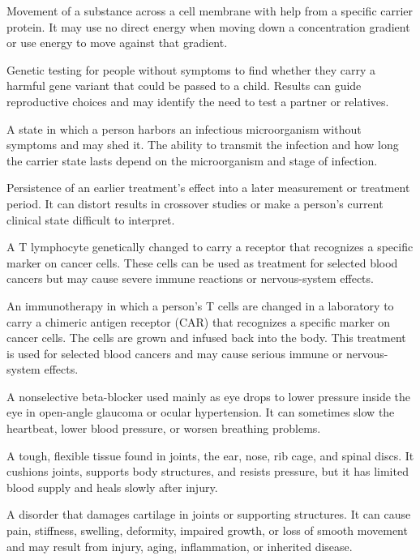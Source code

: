  Movement of a substance across a cell membrane with help from a specific carrier protein. It may use no direct energy when moving down a concentration gradient or use energy to move against that gradient.

 Genetic testing for people without symptoms to find whether they carry a harmful gene variant that could be passed to a child. Results can guide reproductive choices and may identify the need to test a partner or relatives.

 A state in which a person harbors an infectious microorganism without symptoms and may shed it. The ability to transmit the infection and how long the carrier state lasts depend on the microorganism and stage of infection.

 Persistence of an earlier treatment's effect into a later measurement or treatment period. It can distort results in crossover studies or make a person's current clinical state difficult to interpret.

 A T lymphocyte genetically changed to carry a receptor that recognizes a specific marker on cancer cells. These cells can be used as treatment for selected blood cancers but may cause severe immune reactions or nervous-system effects.

 An immunotherapy in which a person’s T cells are changed in a laboratory to carry a chimeric antigen receptor (CAR) that recognizes a specific marker on cancer cells. The cells are grown and infused back into the body. This treatment is used for selected blood cancers and may cause serious immune or nervous-system effects.

 A nonselective beta-blocker used mainly as eye drops to lower pressure inside the eye in open-angle glaucoma or ocular hypertension. It can sometimes slow the heartbeat, lower blood pressure, or worsen breathing problems.

 A tough, flexible tissue found in joints, the ear, nose, rib cage, and spinal discs. It cushions joints, supports body structures, and resists pressure, but it has limited blood supply and heals slowly after injury.

 A disorder that damages cartilage in joints or supporting structures. It can cause pain, stiffness, swelling, deformity, impaired growth, or loss of smooth movement and may result from injury, aging, inflammation, or inherited disease.

